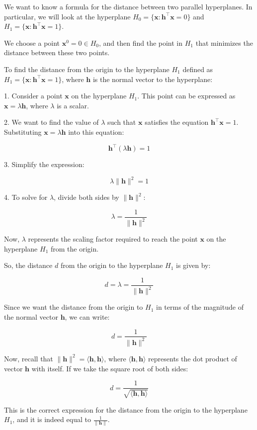 We want to know a formula for the distance between two parallel hyperplanes.   In particular, we will look at the hyperplane $H_0 = \{ \mathbf{x} :  \mathbf{h}^\top \mathbf{x} = 0\}$ and $H_1 = \{\mathbf{x} : \mathbf{h}^\top \mathbf{x} = 1\}$.

We choose a point $\mathbf{x}^0 = 0 \in H_0$, and then find the point in $H_1$ that minimizes the distance between these two points.


To find the distance from the origin to the hyperplane \(H_1\) defined as \(H_1 = \{\mathbf{x} : \mathbf{h}^\top \mathbf{x} = 1\}\), where \(\mathbf{h}\) is the normal vector to the hyperplane:

1. Consider a point \(\mathbf{x}\) on the hyperplane \(H_1\). This point can be expressed as \(\mathbf{x}= \lambda \mathbf{h}\), where \(\lambda\) is a scalar.

2. We want to find the value of \(\lambda\) such that \(\mathbf{x}\) satisfies the equation \(\mathbf{h}^\top \mathbf{x} = 1\). Substituting \(\mathbf{x} = \lambda \mathbf{h}\) into this equation:

\[
\mathbf{h}^\top (\lambda \mathbf{h}) = 1
\]

3. Simplify the expression:

\[
\lambda \|\mathbf{h}\|^2 = 1
\]

4. To solve for \(\lambda\), divide both sides by \(\|\mathbf{h}\|^2\):

\[
\lambda = \frac{1}{\|\mathbf{h}\|^2}
\]

Now, \(\lambda\) represents the scaling factor required to reach the point \(\mathbf{x}\) on the hyperplane \(H_1\) from the origin.

So, the distance \(d\) from the origin to the hyperplane \(H_1\) is given by:

\[
d = \lambda = \frac{1}{\|\mathbf{h}\|^2}
\]

Since we want the distance from the origin to \(H_1\) in terms of the magnitude of the normal vector \(\mathbf{h}\), we can write:

\[
d = \frac{1}{\|\mathbf{h}\|^2}
\]

Now, recall that \(\|\mathbf{h}\|^2 = \langle \mathbf{h}, \mathbf{h} \rangle\), where \(\langle \mathbf{h}, \mathbf{h} \rangle\) represents the dot product of vector \(\mathbf{h}\) with itself. If we take the square root of both sides:

\[
d = \frac{1}{\sqrt{\langle \mathbf{h}, \mathbf{h} \rangle}}
\]

This is the correct expression for the distance from the origin to the hyperplane \(H_1\), and it is indeed equal to \(\frac{1}{\|\mathbf{h}\|}\).



